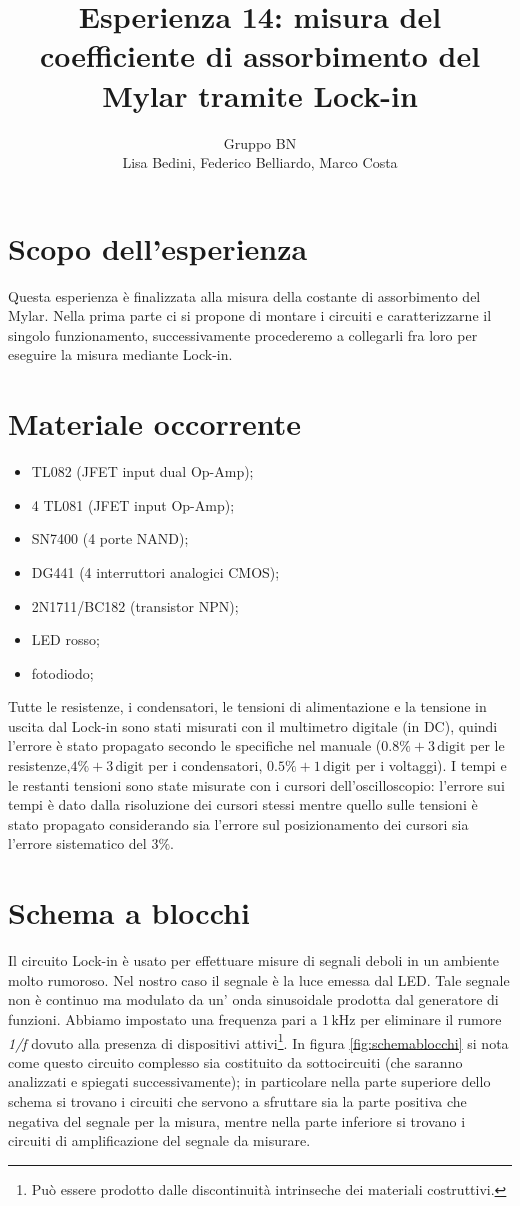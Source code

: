 \documentclass[10pt,a4paper]{article}
\author{Gruppo BN \\ Lisa Bedini, Federico Belliardo, Marco Costa}
\title{Esperienza 14: misura del coefficiente di assorbimento del Mylar tramite Lock-in}
\begin{document}
\maketitle
\section{Scopo dell'esperienza}
Questa esperienza è finalizzata alla misura della costante di assorbimento del Mylar. Nella prima parte ci si propone di montare i circuiti e caratterizzarne il singolo funzionamento, successivamente procederemo a collegarli fra loro per eseguire la misura mediante Lock-in.

\section{Materiale occorrente}
\begin{itemize}
\item TL082 (JFET input dual Op-Amp);
\item 4 TL081 (JFET input Op-Amp);
\item SN7400 (4 porte NAND);
\item DG441 (4 interruttori analogici CMOS);
\item 2N1711/BC182 (transistor NPN);
\item LED rosso;
\item fotodiodo;
\end{itemize}

Tutte le resistenze, i condensatori, le tensioni di alimentazione e la tensione in uscita dal Lock-in sono stati misurati con il multimetro digitale (in DC), quindi l'errore è stato propagato secondo le specifiche nel manuale ($0.8\% + 3\,\mbox{digit}$ per le resistenze,$4\% + 3\, \mbox{digit}$  per i condensatori, $0.5\% + 1\,\mbox{digit}$ per i voltaggi). I tempi e le restanti tensioni sono state misurate con i cursori dell'oscilloscopio: l'errore sui tempi è dato dalla risoluzione dei cursori stessi mentre quello sulle tensioni è stato propagato considerando sia l'errore sul posizionamento dei cursori sia l'errore sistematico del $3\%$.

\section{Schema a blocchi}
Il circuito Lock-in è usato per effettuare misure di segnali deboli in un ambiente molto rumoroso. Nel nostro caso il segnale è la luce emessa dal LED. Tale segnale non è continuo ma modulato da un' onda sinusoidale prodotta dal generatore di funzioni. Abbiamo impostato una frequenza pari a $1\,\mbox{kHz}$ per eliminare il rumore \emph{1/f} dovuto alla presenza di dispositivi attivi\footnote{Può essere prodotto dalle discontinuità intrinseche dei materiali costruttivi.}. In figura \ref{fig:schemablocchi} si nota come questo circuito complesso sia costituito da sottocircuiti (che saranno analizzati e spiegati successivamente); in particolare nella parte superiore dello schema si trovano i circuiti che servono a sfruttare sia la parte positiva che negativa del segnale per la misura, mentre nella parte inferiore si trovano i circuiti di amplificazione del segnale da misurare.
\end{document}
